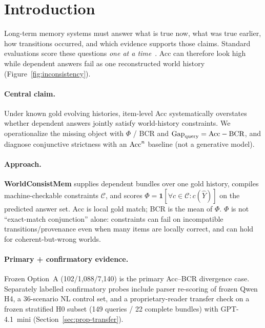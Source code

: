 \section{Introduction}
\label{sec:intro}

Long-term memory systems must answer what is true now, what was true earlier, how transitions occurred, and which evidence supports those claims. Standard evaluations score these questions \emph{one at a time}~\citep{wu2025longMemEval,wu2026longMemEvalV2,hu2025memoryAgentBench,tao2026memConflict,xie2026dynamicMem,wang2026evoMemBench,hu2026everMemBench,liu2026worldMemArena}. Acc can therefore look high while dependent answers fail as one reconstructed world history (Figure~\ref{fig:inconsistency}).

\paragraph{Central claim.} Under known gold evolving histories, item-level Acc systematically overstates whether dependent answers jointly satisfy world-history constraints. We operationalize the missing object with $\Phi$ / BCR and $\mathrm{Gap}_{\mathrm{query}}=\mathrm{Acc}-\mathrm{BCR}$, and diagnose conjunctive strictness with an $\mathrm{Acc}^{n}$ baseline (not a generative model).

\paragraph{Approach.} \textbf{WorldConsistMem} supplies dependent bundles over one gold history, compiles machine-checkable constraints $\mathcal{C}$, and scores $\Phi=\mathbf{1}[\forall c\in\mathcal{C}:c(\hat Y)]$ on the predicted answer set. Acc is local gold match; BCR is the mean of $\Phi$. $\Phi$ is not ``exact-match conjunction'' alone: constraints can fail on incompatible transitions/provenance even when many items are locally correct, and can hold for coherent-but-wrong worlds.

\paragraph{Primary + confirmatory evidence.} Frozen Option~A (102/1{,}088/7{,}140) is the primary Acc--BCR divergence case. Separately labelled confirmatory probes include parser re-scoring of frozen Qwen H4, a 36-scenario NL control set, and a proprietary-reader transfer check on a frozen stratified H0 subset (149 queries / 22 complete bundles) with GPT-4.1~mini (Section~\ref{sec:prop-transfer}).


